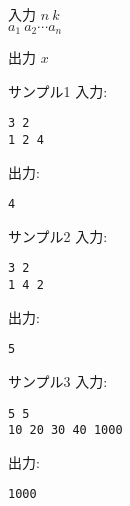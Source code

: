 \documentclass[a4paper,twoside,onecolumn,openany,article,10pt]{memoir}
\theoremstyle{remark}
\begin{document}
\begin{itembox}[l]{入力}
$n~k$\\
$a_1~a_2 \dotsb a_n$
\end{itembox}

\begin{itembox}[l]{出力}
$x$
\end{itembox}

\begin{itembox}[l]{サンプル1}
入力:
\begin{verbatim}
3 2
1 2 4
\end{verbatim}
出力:
\begin{verbatim}
4
\end{verbatim}
\end{itembox}

\begin{itembox}[l]{サンプル2}
入力:
\begin{verbatim}
3 2
1 4 2
\end{verbatim}
出力:
\begin{verbatim}
5
\end{verbatim}
\end{itembox}

\begin{itembox}[l]{サンプル3}
入力:
\begin{verbatim}
5 5
10 20 30 40 1000
\end{verbatim}
出力:
\begin{verbatim}
1000
\end{verbatim}
\end{itembox}
\end{document}
